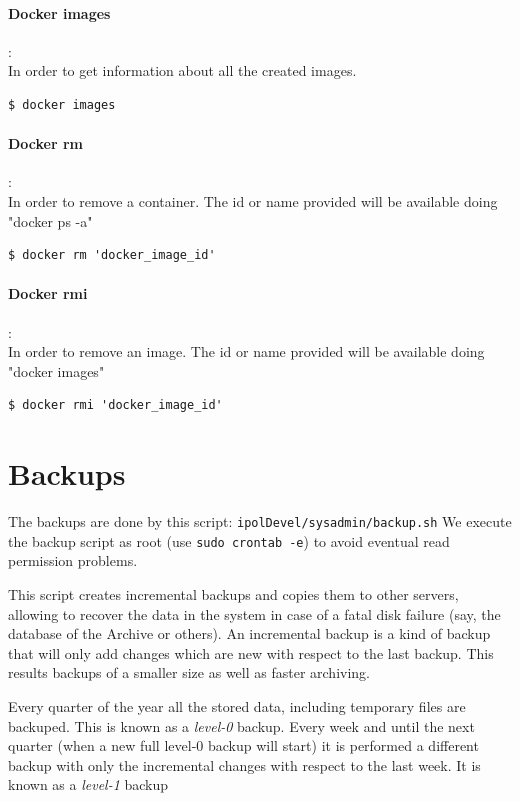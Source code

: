 \documentclass[a4paper,12pt]{article}
\begin{document}
\paragraph{Docker images}:\\
In order to get information about all the created images.
\begin{lstlisting}[firstnumber=1,breaklines]
  $ docker images
\end{lstlisting}

\paragraph{Docker rm}:\\
In order to remove a container. The id or name provided will be available doing "docker ps -a"
\begin{lstlisting}[firstnumber=1,breaklines]
  $ docker rm 'docker_image_id'
\end{lstlisting}

\paragraph{Docker rmi}:\\
In order to remove an image. The id or name provided will be available doing "docker images"
\begin{lstlisting}[firstnumber=1,breaklines]
  $ docker rmi 'docker_image_id'
\end{lstlisting}



\section{Backups}
\label{sec:backups}
The backups are done by this script: {\tt ipolDevel/sysadmin/backup.sh}
We execute the backup script as root (use {\tt sudo crontab -e}) to avoid eventual read permission problems.

This script creates incremental backups and copies them to other servers, allowing to recover the data in the system in case of a fatal disk failure (say, the database of the Archive or others). An incremental backup is a kind of backup that will only add changes which are new with respect to the last backup. This results backups of a smaller size as well as faster archiving.

Every quarter of the year all the stored data, including temporary files are backuped. This is known as a \emph{level-0} backup. Every week and until the next quarter (when a new full level-0 backup will start) it is performed  a different backup with only the incremental changes with respect to the last week. It is known as a \emph{level-1} backup
\end{document}

